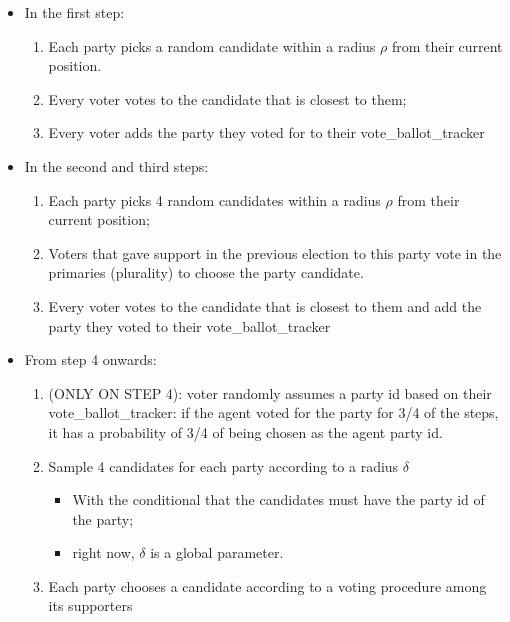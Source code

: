 \documentclass[11pt]{article}
\begin{document}
\begin{itemize}
  \item In the first step:
  \begin{enumerate}
    \item  Each party picks a random candidate within a radius \(\rho\) from their current position.
    \item Every voter votes to the candidate that is closest to them;
    \item Every voter adds the party they voted for  to their vote\_ballot\_tracker
  \end{enumerate}
  \item In the second and third steps:
  \begin{enumerate}
    \item Each party picks 4 random candidates within a radius \(\rho\) from their current position;
    \item Voters that gave support in the previous election to this party vote in the primaries (plurality) to choose the party candidate.
    \item Every voter votes to the candidate that is closest to them and add the party they voted  to their vote\_ballot\_tracker
  \end{enumerate}
  \item From step 4 onwards:

  \begin{enumerate}
    \item (ONLY ON STEP 4): voter randomly assumes a party id based on their vote\_ballot\_tracker: if the agent voted for the party for 3/4 of the steps, it has a probability of 3/4 of being chosen as the agent party id.

\item Sample 4 candidates for each party according to a radius \(\delta\)
\begin{itemize}
\item With the conditional that the candidates must have the party id of the party;
\item right now, \(\delta\) is a global parameter.
\end{itemize}
\item Each party chooses a candidate according to a voting procedure among its supporters


\end{enumerate}
\end{itemize}
\end{document}
